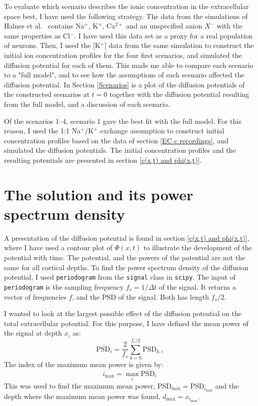 \documentclass{uiophd}
\begin{document}
To evaluate which scenario describes the ionic concentration in the extracellular space best, I have used the following strategy. 
The data from the  simulations of Halnes et al.~\cite{Halnes2016} contains Na$^+$, K$^+$, Ca$^{2+}$ and an unspecified anion $X^-$ with the same properties as Cl$^-$. I have used this data set as a proxy for a real population of neurons. Then, I used the [K$^+$] data from the same simulation to construct the initial ion concentration profiles for the four first scenarios, and simulated the diffusion potential for each of them. This made me able to compare each scenario to a "full model", and to see how the assumptions of each scenario affected the diffusion potential. In Section \ref{Scenarios} is a plot of the diffusion potentials of the constructed scenarios at $t=0$ together with the diffusion potential resulting from the full model, and a discussion of each scenario. 

Of the scenarios 1--4, scenario 1 gave the best fit with the full model. For this reason, I used the 1:1 Na$^+$/K$^+$ exchange assumption to construct initial concentration profiles based on the data of section \ref{EC c recordings}, and simulated the diffusion potentials. The  initial concentration profiles and the resulting potentials are presented in section \ref{c(x,t) and phi(x,t)}.

\section{The solution and its power spectrum density}\label{PSD of solution}
A presentation of the diffusion potential is found in section \ref{c(x,t) and phi(x,t)}, where I have used a contour plot of $\Phi(x,t)$ to illustrate the development of the potential with time. The potential, and the powers of the potential are not the same for all cortical depths.
To find the power spectrum density of the diffusion potential, I used \texttt{periodogram}  from the \texttt{signal} class in \texttt{scipy}. The input of \texttt{periodogram} is the sampling frequency $f_s = 1/\Delta t$ of the signal. It returns a vector of frequencies $f$, and the PSD of the signal. Both has length $f_s/2$. 

I wanted to look at the largest possible effect of the diffusion potential on the total extracellular potential. For this purpose, I have defined the mean power of the signal at depth $x_i$ as: 
 \begin{equation}
\overline{\text{PSD}_i} = \frac{2}{f_s} \sum_{k=0}^{f_s/2} \text{PSD}_{k,i}
 \end{equation}
The index of the maximum mean power is given by:
\begin{equation}
i_{\text{max}} = \max_i \overline{\text{PSD}_i}
\end{equation}
This was used to find the maximum mean power, $\text{PSD}_{\text{max}} = \text{PSD}_{i_{\text{max}}}$ and the depth where the maximum mean power was found, $d_{\text{max}} = x_{i_{\text{max}}}$.
\end{document}
